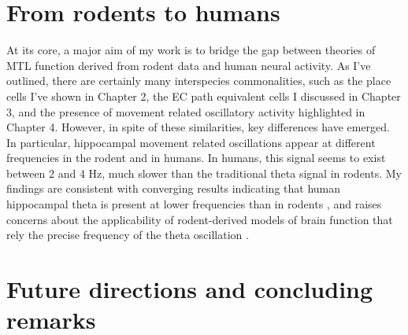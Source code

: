 \section{From rodents to humans}

At its core, a major aim of my work is to bridge the gap between theories of MTL function derived from rodent data and human neural activity. As I've outlined, there are certainly many interspecies commonalities, such as the place cells I've shown in Chapter 2, the EC path equivalent cells I discussed in Chapter 3, and the presence of movement related oscillatory activity highlighted in Chapter 4. However, in spite of these similarities, key differences have emerged. In particular, hippocampal movement related oscillations appear at different frequencies in the rodent and in humans. In humans, this signal seems to exist between 2 and 4 Hz, much slower than the traditional theta signal in rodents. My findings are consistent with converging results indicating that human hippocampal theta is present at lower frequencies than in rodents \citep{WatrEtal13a,Jaco14}, and raises concerns about the applicability of rodent-derived models of brain function that rely the precise frequency of the theta oscillation \citep{JensLism98,BurgEtal07}.










% 

\section{Future directions and concluding remarks}

